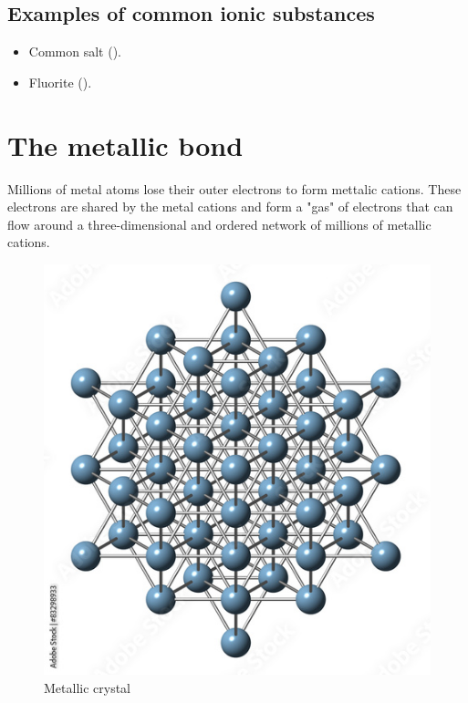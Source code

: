 \documentclass{article}
\begin{document}
		\subsection{Examples of common ionic substances}

			\begin{itemize}
				\item Common salt ().
				\item Fluorite ().
			\end{itemize}


	\section{The metallic bond}
		Millions of metal atoms lose their outer electrons to form mettalic cations. These electrons 
		are shared by the metal cations and form a "gas" of electrons that can flow around a three-dimensional
		and ordered network of millions of metallic cations. 

		\begin{figure}[htp]
			\centering
			\includegraphics{metallic_crystal.jpg}
			\caption{Metallic crystal}
		\end{figure}
\end{document}
